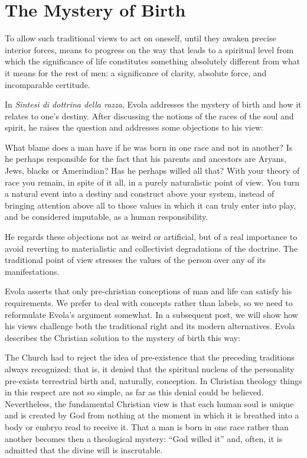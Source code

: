 \section{The Mystery of Birth}

\begin{quotex}
To allow such traditional views to act on oneself, until they awaken precise interior forces, means to progress on the way that leads to a spiritual level from which the significance of life constitutes something absolutely different from what it means for the rest of men: a significance of clarity, absolute force, and incomparable certitude.
\end{quotex}


In \emph{Sintesi di dottrina della razza}, Evola addresses the mystery of birth and how it relates to one's destiny. After discussing the notions of the races of the soul and spirit, he raises the question and addresses some objections to his view:

\begin{quotex}
What blame does a man have if he was born in one race and not in another? Is he perhaps responsible for the fact that his parents and ancestors are Aryans, Jews, blacks or Amerindian? Has he perhaps willed all that? With your theory of race you remain, in spite of it all, in a purely naturalistic point of view. You turn a natural event into a destiny and construct above your system, instead of bringing attention above all to those values in which it can truly enter into play, and be considered imputable, as a human responsibility.
\end{quotex}


He regards these objections not as weird or artificial, but of a real importance to avoid reverting to materialistic and collectivist degradations of the doctrine. The traditional point of view stresses the values of the person over any of its manifestations.

Evola asserts that only pre-christian conceptions of man and life can satisfy his requirements. We prefer to deal with concepts rather than labels, so we need to reformulate Evola's argument somewhat. In a subsequent post, we will show how his views challenge both the traditional right and its modern alternatives. Evola describes the Christian solution to the mystery of birth this way:

\begin{quotex}
The Church had to reject the idea of pre-existence that the preceding traditions always recognized: that is, it denied that the spiritual nucleus of the personality pre-exists terrestrial birth and, naturally, conception. In Christian theology things in this respect are not so simple, as far as this denial could be believed. Nevertheless, the fundamental Christian view is that each human soul is unique and is created by God from nothing at the moment in which it is breathed into a body or embryo read to receive it. That a man is born in one race rather than another becomes then a theological mystery: ``God willed it'' and, often, it is admitted that the divine will is inscrutable.
\end{quotex}


